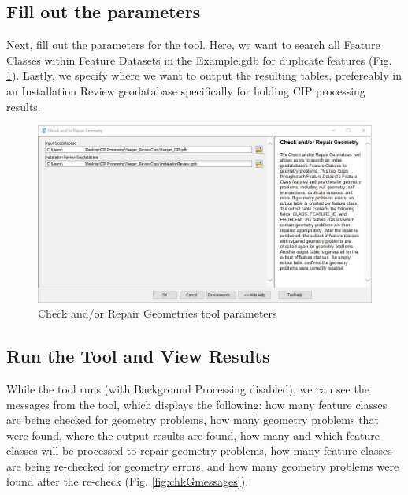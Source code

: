 \documentclass[openany]{book}
\theoremstyle{definition}
\theoremstyle{definition}
\theoremstyle{definition}
\theoremstyle{remark}
\begin{document}
\subsection{Fill out the parameters}\label{fill-out-the-parameters-5}

Next, fill out the parameters for the tool. Here, we want to search all
Feature Classes within Feature Datasets in the Example.gdb for duplicate
features (Fig. \ref{fig:chkGparams}). Lastly, we specify where we want
to output the resulting tables, prefereably in an Installation Review
geodatabase specifically for holding CIP processing results.\\

\begin{figure}[H]

{\centering \includegraphics[width=5.18in,]{figures/chkG-params} 

}

\caption{Check and/or Repair Geometries tool parameters}\label{fig:chkGparams}
\end{figure}

\subsection{Run the Tool and View
Results}\label{run-the-tool-and-view-results-5}

While the tool runs (with Background Processing disabled), we can see
the messages from the tool, which displays the following: how many
feature classes are being checked for geometry problems, how many
geometry problems that were found, where the output results are found,
how many and which feature classes will be processed to repair geometry
problems, how many feature classes are being re-checked for geometry
errors, and how many geometry problems were found after the re-check
(Fig. \ref{fig:chkGmessages}).
\end{document}
